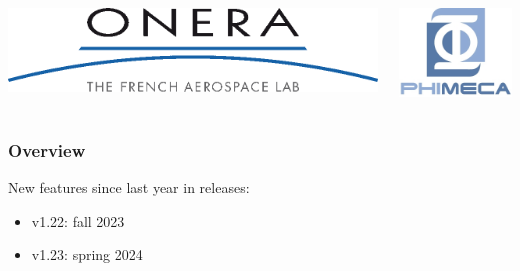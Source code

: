 \documentclass[aspectratio=169]{beamer}
\begin{document}
\begin{frame}
\begin{columns}
  \begin{center}
\includegraphics[height=0.05\textheight]{figures/onera-logo.png}
\end{center}

  \begin{center}
\includegraphics[height=0.08\textheight]{figures/logo-phimeca.png}
\end{center}


  \end{columns}

  \end{frame}

\begin{frame}
\frametitle{Overview}

New features since last year in releases:

\begin{itemize}
\item v1.22: fall 2023
\item v1.23: spring 2024
\end{itemize}

\end{frame}
  


\end{document}
